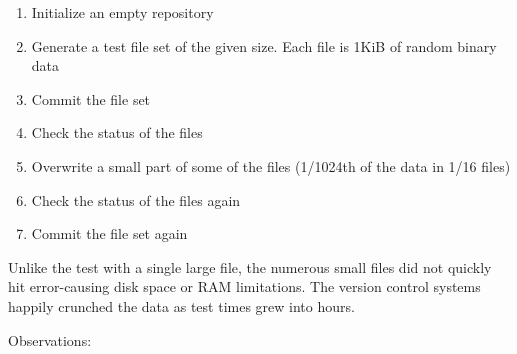 \begin{enumerate}
    \setlength{\itemsep}{0pt}
    \setlength{\parskip}{0pt}
    \setlength{\parsep}{0pt}
    \item Initialize an empty repository
    \item Generate a test file set of the given size. Each file is 1KiB of
        random binary data
    \item Commit the file set
    \item Check the status of the files
    \item Overwrite a small part of some of the files (1/1024th of the data in
        1/16 files)
    \item Check the status of the files again
    \item Commit the file set again
\end{enumerate}

Unlike the test with a single large file, the numerous small files did not
quickly hit error-causing disk space or RAM limitations. The version control
systems happily crunched the data as test times grew into hours.

Observations:

